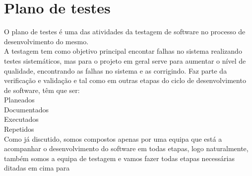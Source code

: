\chapter{Plano de testes}
\label{plano_de_testes}
O plano de testes é uma das atividades da testagem de software no processo de desenvolvimento do mesmo.\\
 A testagem tem como objetivo principal encontar falhas no sistema realizando testes sistemáticos, mas para o projeto em geral serve para aumentar o nível de qualidade,  encontrando as falhas no sistema e as corrigindo. Faz parte da verificação e validação e tal como em outras etapas do ciclo de desenvolvimento de software, têm que ser:\\ Planeados\\
 Documentados\\
 Executados\\
 Repetidos\\
Como já discutido, somos compostos apenas por uma equipa que está a acompanhar o desenvolvimento do software em todas etapas, logo naturalmente, também somos a equipa de testagem e vamos fazer todas etapas necessárias ditadas em cima para 